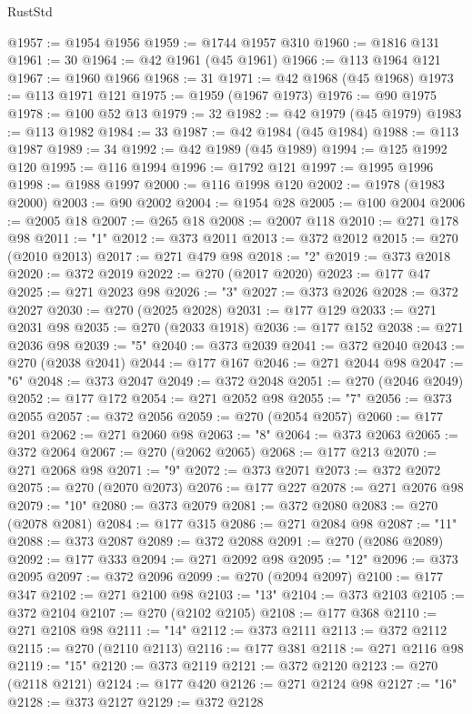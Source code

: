 \begin{lexlean}{RustStd}
\begin{coremodule}
@1957 := @1954 @1956
@1959 := @1744 @1957 @310
@1960 := @1816 @131
@1961 := 30
@1964 := @42 @1961 (@45 @1961)
@1966 := @113 @1964 @121
@1967 := @1960 @1966
@1968 := 31
@1971 := @42 @1968 (@45 @1968)
@1973 := @113 @1971 @121
@1975 := @1959 (@1967 @1973)
@1976 := @90 @1975
@1978 := @100 @52 @13
@1979 := 32
@1982 := @42 @1979 (@45 @1979)
@1983 := @113 @1982
@1984 := 33
@1987 := @42 @1984 (@45 @1984)
@1988 := @113 @1987
@1989 := 34
@1992 := @42 @1989 (@45 @1989)
@1994 := @125 @1992 @120
@1995 := @116 @1994
@1996 := @1792 @121
@1997 := @1995 @1996
@1998 := @1988 @1997
@2000 := @116 @1998 @120
@2002 := @1978 (@1983 @2000)
@2003 := @90 @2002
@2004 := @1954 @28
@2005 := @100 @2004
@2006 := @2005 @18
@2007 := @265 @18
@2008 := @2007 @118
@2010 := @271 @178 @98
@2011 := "1"
@2012 := @373 @2011
@2013 := @372 @2012
@2015 := @270 (@2010 @2013)
@2017 := @271 @479 @98
@2018 := "2"
@2019 := @373 @2018
@2020 := @372 @2019
@2022 := @270 (@2017 @2020)
@2023 := @177 @47
@2025 := @271 @2023 @98
@2026 := "3"
@2027 := @373 @2026
@2028 := @372 @2027
@2030 := @270 (@2025 @2028)
@2031 := @177 @129
@2033 := @271 @2031 @98
@2035 := @270 (@2033 @1918)
@2036 := @177 @152
@2038 := @271 @2036 @98
@2039 := "5"
@2040 := @373 @2039
@2041 := @372 @2040
@2043 := @270 (@2038 @2041)
@2044 := @177 @167
@2046 := @271 @2044 @98
@2047 := "6"
@2048 := @373 @2047
@2049 := @372 @2048
@2051 := @270 (@2046 @2049)
@2052 := @177 @172
@2054 := @271 @2052 @98
@2055 := "7"
@2056 := @373 @2055
@2057 := @372 @2056
@2059 := @270 (@2054 @2057)
@2060 := @177 @201
@2062 := @271 @2060 @98
@2063 := "8"
@2064 := @373 @2063
@2065 := @372 @2064
@2067 := @270 (@2062 @2065)
@2068 := @177 @213
@2070 := @271 @2068 @98
@2071 := "9"
@2072 := @373 @2071
@2073 := @372 @2072
@2075 := @270 (@2070 @2073)
@2076 := @177 @227
@2078 := @271 @2076 @98
@2079 := "10"
@2080 := @373 @2079
@2081 := @372 @2080
@2083 := @270 (@2078 @2081)
@2084 := @177 @315
@2086 := @271 @2084 @98
@2087 := "11"
@2088 := @373 @2087
@2089 := @372 @2088
@2091 := @270 (@2086 @2089)
@2092 := @177 @333
@2094 := @271 @2092 @98
@2095 := "12"
@2096 := @373 @2095
@2097 := @372 @2096
@2099 := @270 (@2094 @2097)
@2100 := @177 @347
@2102 := @271 @2100 @98
@2103 := "13"
@2104 := @373 @2103
@2105 := @372 @2104
@2107 := @270 (@2102 @2105)
@2108 := @177 @368
@2110 := @271 @2108 @98
@2111 := "14"
@2112 := @373 @2111
@2113 := @372 @2112
@2115 := @270 (@2110 @2113)
@2116 := @177 @381
@2118 := @271 @2116 @98
@2119 := "15"
@2120 := @373 @2119
@2121 := @372 @2120
@2123 := @270 (@2118 @2121)
@2124 := @177 @420
@2126 := @271 @2124 @98
@2127 := "16"
@2128 := @373 @2127
@2129 := @372 @2128

\end{coremodule}
\end{lexlean}
